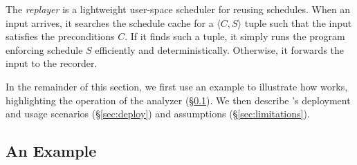 


The \emph{replayer} is a lightweight user-space scheduler for reusing
schedules.  When an input arrives, it searches the schedule cache for a
$\langle C, S \rangle$ tuple such that the input satisfies the
preconditions $C$.  If it finds such a tuple, it simply runs the program
enforcing schedule $S$ efficiently and deterministically.  Otherwise,
it forwards the input to the recorder.

In the remainder of this section, we first use an example to illustrate
how \peregrine works, highlighting the operation of the analyzer
(\S\ref{sec:example}).  We then describe \peregrine's deployment and usage
scenarios (\S\ref{sec:deploy}) and assumptions (\S\ref{sec:limitations}).

\subsection{An Example} \label{sec:example}

